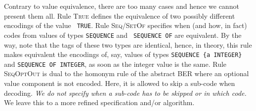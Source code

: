 Contrary to value equivalence, there are too many cases and hence we
cannot present them all. Rule \textsc{True} defines the equivalence of
two possibly different encodings of the value \texttt{\small
TRUE}. Rule \textsc{Seq/SetOf} specifies when (and how, in fact) codes
from values of types \texttt{\small SEQUENCE} and \texttt{\small
SEQUENCE OF} are equivalent. By the way, note that the tags of these
two types are identical, hence, in theory, this rule makes equivalent
the encodings of, say, values of types \texttt{\small SEQUENCE \{a
INTEGER\}} and \texttt{\small SEQUENCE OF INTEGER}, as soon as the
integer value is the same. Rule \textsc{SeqOptOut} is dual to the
homonym rule of the abstract BER where an optional value component is
not encoded. Here, it is allowed to skip a sub-code when
decoding. \emph{We do not specify when a sub-code has to be skipped or
in which code.} We leave this to a more refined specification and/or
algorithm.

\medskip

